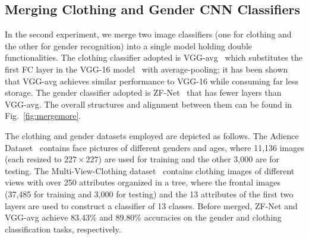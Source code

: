 \documentclass{article}
\begin{document}
	
	
	
	\subsection*{Merging Clothing and Gender CNN Classifiers}
	In the second experiment, we merge two image classifiers (one for clothing and the other for gender recognition) into a single model holding double functionalities.
	The clothing classifier adopted is VGG-avg~\cite{yang2018supervised} which substitutes the first FC layer in the VGG-16 model~\cite{simonyan2014very} with average-pooling; it has been shown that VGG-avg achieves similar performance to VGG-16 while consuming far less storage.
	The gender classifier adopted is ZF-Net~\cite{ZFNet} that has fewer layers than VGG-avg.
	The overall structures and alignment between them can be found in Fig.~\ref{fig:mergemore}.
	
	The clothing and gender datasets employed are depicted as follows.
	The Adience Dataset~\cite{eidinger2014age} contains face pictures of different genders and ages, where 11,136 images (each resized to $227 \times 227$) are used for training and the other 3,000 are for testing.
	The Multi-View-Clothing dataset~\cite{DBLP:conf/mir/LiuCC16} contains clothing images of different views with over 250 attributes organized in a tree, where the frontal images (37,485 for training and 3,000 for testing) and the 13 attributes of the first two layers are used to construct a classifier of 13 classes.
	Before merged, ZF-Net and VGG-avg achieve 83.43\% and 89.80\% accuracies on the gender and clothing classification tasks, respectively.
	
\end{document}
